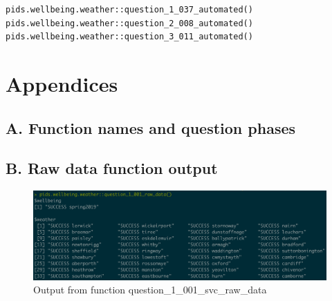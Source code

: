 \documentclass[12pt, oneside, openany]{book}
\begin{document}
\begin{lstlisting}
pids.wellbeing.weather::question_1_037_automated()
pids.wellbeing.weather::question_2_008_automated()
pids.wellbeing.weather::question_3_011_automated()
\end{lstlisting}
\pagebreak
 


\chapter*{Appendices}

\newpage
\section*{A. Function names and question phases}
\label{appendix:function-names-and-question-phases}

\newpage
\section*{B. Raw data function output}
\label{appendix:question_1_001_results}

\begin{figure}
	\centering
	\captionsetup{justification=centering}
	\includegraphics[scale=0.7]{question_1_001_results}
	\caption{Output from function question\_1\_001\_svc\_raw\_data}
\end{figure}

\backmatter
\end{document}
